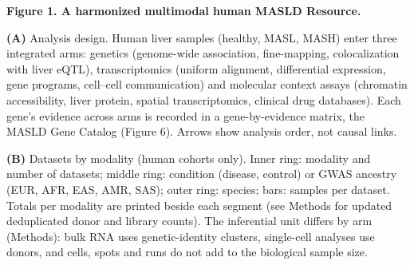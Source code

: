 \textbf{Figure 1. A harmonized multimodal human MASLD Resource.}

\textbf{(A)} Analysis design. Human liver samples (healthy, MASL, MASH) enter three integrated arms: genetics (genome-wide association, fine-mapping, colocalization with liver eQTL), transcriptomics (uniform alignment, differential expression, gene programs, cell--cell communication) and molecular context assays (chromatin accessibility, liver protein, spatial transcriptomics, clinical drug databases). Each gene's evidence across arms is recorded in a gene-by-evidence matrix, the MASLD Gene Catalog (Figure 6). Arrows show analysis order, not causal links.

\textbf{(B)} Datasets by modality (human cohorts only). Inner ring: modality and number of datasets; middle ring: condition (disease, control) or GWAS ancestry (EUR, AFR, EAS, AMR, SAS); outer ring: species; bars: samples per dataset. Totals per modality are printed beside each segment (see Methods for updated deduplicated donor and library counts). The inferential unit differs by arm (Methods): bulk RNA uses genetic-identity clusters, single-cell analyses use donors, and cells, spots and runs do not add to the biological sample size.
